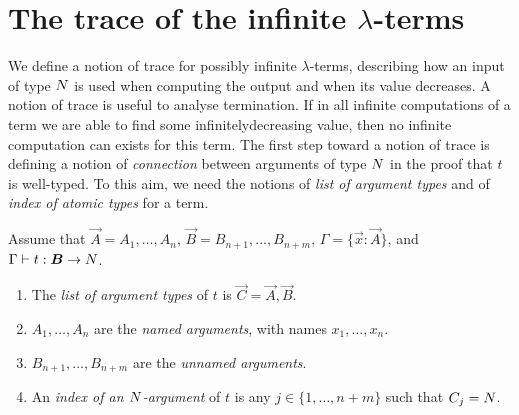 
\section{The trace of the infinite $\lambda$-terms}
We define a notion of trace for possibly infinite $\lambda$-terms, 
describing how an input of type ${N}$ is used when computing the output
and when its value decreases. A notion of trace is useful to analyse termination.
If in all infinite computations of a term we are able to find some infinitelydecreasing value, then no infinite computation can exists for this term. 
The first step toward a notion of  trace is defining a notion of \emph{connection} 
between arguments of type ${N}$ in the proof that $t$ is well-typed. 
To this aim, we need the notions of \emph{list of argument
 types} and of \emph{index of atomic types} for a term.

%
%


\begin{definition}
Assume that $\vec{A} = A_1, \ldots, A_n$, $\vec{B}=B_{n+1}, \ldots, B_{n+m}$, 
$\Gamma = \{\vec{x}:\vec{A}\}$,
and $\Gamma \vdash t: \vec{B} \rightarrow \N$.

\begin{enumerate}
\item
The \emph{list of argument types} of $t$ is $\vec{C} = \vec{A},\vec{B}$. 

\item
$A_1, \ldots, A_n$ are the \emph{named arguments}, with names $x_1, \ldots, x_n$.

\item
$B_{n+1}, \ldots, B_{n+m}$ are the \emph{unnamed arguments}.

\item
An \emph{index of an ${N}$-argument} 
of $t$ is any $j \in \{1, \ldots, n+m\}$ such that $C_j = {N}$.

\end{enumerate}
\end{definition}

